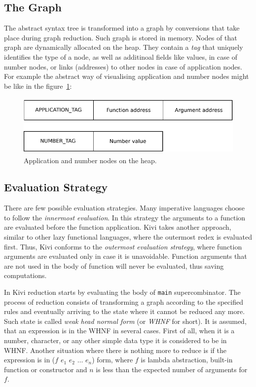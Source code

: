 \documentclass[12pt,a4paper]{report}
\begin{document}
\subsection{The Graph}
The abstract syntax tree is transformed into a graph by conversions that take
place during graph reduction. Such graph is stored in memory. Nodes of that
graph are dynamically allocated on the heap. They contain a \textit{tag} that
uniquely identifies the type of a node, as well as additinoal fields like
values, in case of number nodes, or links (addresses) to other nodes in case of
application nodes. For example the abstract way of visualising application and
number nodes might be like in the figure~\ref{fig:num_ap_nodes}:

\vspace*{0.2in}
\begin{figure}[h!]
  \centering
  \includegraphics[height=3cm]{nodes}
  \caption{Application and number nodes on the heap.}
  \label{fig:num_ap_nodes}
\end{figure}

\subsection{Evaluation Strategy}
There are few possible evaluation strategies. Many imperative languages choose
to follow the \textit{innermost evaluation}. In this strategy the arguments to
a function are evaluated before the function application. Kivi takes another
approach, similar to other lazy functional languages, where the outermost redex
is evaluated first. Thus, Kivi conforms to the \textit{outermost evaluation
strategy}, where function arguments are evaluated only in case it is
unavoidable. Function arguments that are not used in the body of function
will never be evaluated, thus saving computations.

In Kivi reduction starts by evaluating the body of \texttt{main}
supercombinator. The process of reduction consists of transforming a graph
according to the specified rules and eventually arriving to the state where it
cannot be reduced any more. Such state is called \textit{weak head normal form}
(or \textit{WHNF} for short). It is assumed, that an expression is in the WHNF
in several cases. First of all, when it is a number, character, or any other
simple data type it is considered to be in WHNF. Another situation where there
is nothing more to reduce is if the expression is in ($f$ $e_1$ $e_2$ $\ldots$
$e_n$) form, where $f$ is lambda abstraction, built-in function or constructor
and $n$ is less than the expected number of arguments for $f$.
\end{document}

